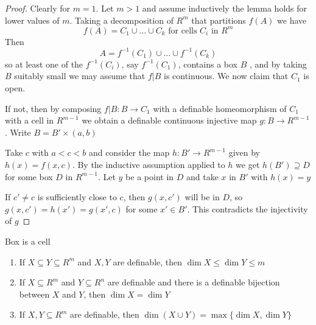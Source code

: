 \documentclass[11pt]{article}
\begin{document}
\begin{proof}
Clearly for \(m=1\). Let \(m>1\) and assume inductively the lemma holds for lower values
of \(m\). Taking a decomposition of \(R^m\) that partitions \(f(A)\) we have
\begin{equation*}
f(A)=C_1\cup\dots\cup C_k\text{ for cells $C_i$ in }R^m
\end{equation*}
Then
\begin{equation*}
A=f^{-1}(C_1)\cup\dots\cup f^{-1}(C_k)
\end{equation*}
so at least one of the \(f^{-1}(C_i)\), say \(f^{-1}(C_1)\), contains a box \(B\) , and by
taking \(B\) suitably small we may assume that \(f|B\) is continuous. We now claim that \(C_1\)
is open.

If not, then by composing \(f|B:B\to C_1\) with a definable homeomorphism of \(C_1\) with a
cell in \(R^{m-1}\) we obtain a definable continuous injective map \(g:B\to R^{m-1}\).
Write \(B=B'\times(a,b)\)

Take \(c\) with \(a<c<b\) and consider the map \(h:B'\to R^{m-1}\) given by \(h(x)=f(x,c)\). By
the inductive assumption applied to \(h\) we get \(h(B')\supseteq D\) for some box \(D\) in \(R^{m-1}\).
Let \(y\) be a point in \(D\) and take \(x\) in \(B'\) with \(h(x)=y\)

If \(c'\neq c\) is sufficiently close to \(c\), then \(g(x,c')\) will be in \(D\),
so \(g(x,c')=h(x')=g(x',c)\) for some \(x'\in B'\). This contradicts the injectivity of \(g\)
\end{proof}

Box is a cell

\begin{proposition}[]
\begin{enumerate}
\item If \(X\subseteq Y\subseteq R^m\) and \(X,Y\) are definable, then \(\dim X\le\dim Y\le m\)
\item If \(X\subseteq R^m\) and \(Y\subseteq R^n\) are definable and there is a definable bijection between \(X\)
and \(Y\), then \(\dim X=\dim Y\)
\item If \(X,Y\subseteq R^m\) are definable, then \(\dim(X\cup Y)=\max\{\dim X,\dim Y\}\)
\end{enumerate}
\end{proposition}
\end{document}
